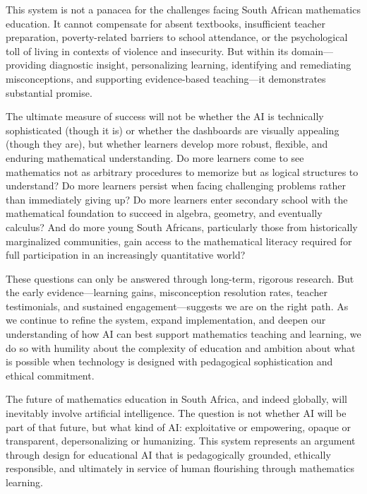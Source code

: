 \documentclass[12pt,a4paper]{article}
\begin{document}
This system is not a panacea for the challenges facing South African mathematics education. It cannot compensate for absent textbooks, insufficient teacher preparation, poverty-related barriers to school attendance, or the psychological toll of living in contexts of violence and insecurity. But within its domain---providing diagnostic insight, personalizing learning, identifying and remediating misconceptions, and supporting evidence-based teaching---it demonstrates substantial promise.

The ultimate measure of success will not be whether the AI is technically sophisticated (though it is) or whether the dashboards are visually appealing (though they are), but whether learners develop more robust, flexible, and enduring mathematical understanding. Do more learners come to see mathematics not as arbitrary procedures to memorize but as logical structures to understand? Do more learners persist when facing challenging problems rather than immediately giving up? Do more learners enter secondary school with the mathematical foundation to succeed in algebra, geometry, and eventually calculus? And do more young South Africans, particularly those from historically marginalized communities, gain access to the mathematical literacy required for full participation in an increasingly quantitative world?

These questions can only be answered through long-term, rigorous research. But the early evidence---learning gains, misconception resolution rates, teacher testimonials, and sustained engagement---suggests we are on the right path. As we continue to refine the system, expand implementation, and deepen our understanding of how AI can best support mathematics teaching and learning, we do so with humility about the complexity of education and ambition about what is possible when technology is designed with pedagogical sophistication and ethical commitment.

The future of mathematics education in South Africa, and indeed globally, will inevitably involve artificial intelligence. The question is not whether AI will be part of that future, but what kind of AI: exploitative or empowering, opaque or transparent, depersonalizing or humanizing. This system represents an argument through design for educational AI that is pedagogically grounded, ethically responsible, and ultimately in service of human flourishing through mathematics learning.
\end{document}
